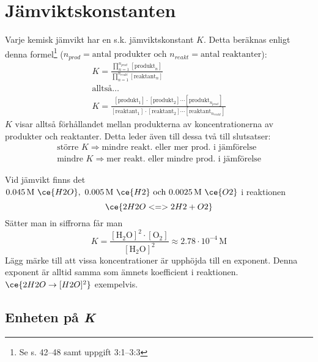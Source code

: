 \section{Jämviktskonstanten}

Varje kemisk jämvikt har en s.k. jämviktskonstant $K$. Detta beräknas enligt denna formel\footnote{Se s. 42--48 samt uppgift 3:1--3:3} ($n_{prod} = \text{antal produkter och } n_{reakt} = \text{antal reaktanter}$):
\begin{gather*}
    \label{eq:jmvkonstant}
    K = \frac{\prod_{n=1}^{n_{prod}}[\mathrm{produkt}_n]}{\prod_{n=1}^{n_{reakt}}[\mathrm{reaktant}_n]} \\
    \text{alltså\ldots} \\
    K = \frac{[\mathrm{produkt}_1] \cdot [\mathrm{produkt}_2] \dotsm [\mathrm{produkt}_{n_{prod}}]}{[\mathrm{reaktant}_1] \cdot [\mathrm{reaktant}_2] \dotsm [\mathrm{reaktant}_{n_{reakt}}]}
\end{gather*}
$K$ visar alltså förhållandet mellan produkterna av koncentrationerna av produkter och reaktanter. Detta leder även till dessa två till slutsatser:
\begin{align*}
    \text{större } K \Rightarrow \text{mindre reakt. eller mer prod. i jämförelse} \\
    \text{mindre } K \Rightarrow \text{mer reakt. eller mindre prod. i jämförelse} 
\end{align*}
\pagebreak
\begin{exm}
    Vid jämvikt finns det $ \mathrm{0.045\,M} \ \ce{H2O},\ \mathrm{0.005\,M} \ \ce{H2} \text{ och } \mathrm{0.0025\,M} \ \ce{O2}$ i reaktionen
    \begin{equation*}
        \ce{2H2O <=> 2H2 + O2}
    \end{equation*}
    Sätter man in siffrorna får man
    \begin{equation*}
        K = \frac{\mathrm{[H_2O]^2 \cdot [O_2]}}{\mathrm{[H_2O]^2}} \approx 2.78 \cdot 10^{-4} \, \mathrm{M}
    \end{equation*}
    Lägg märke till att vissa koncentrationer är upphöjda till en exponent. Denna exponent är alltid samma som ämnets koefficient i reaktionen. \\ $\ce{2H2O \rightarrow [H2O]^2}$ exempelvis.
\end{exm}

\subsection{Enheten på \textit{K}}


